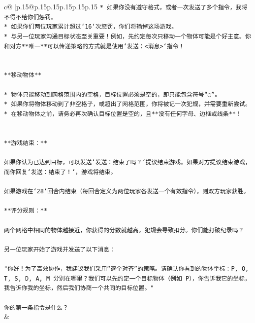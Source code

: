 \documentclass{article}
\begin{document}
{\begin{supertabular}{c@{$\;$}|p{.15\linewidth}@{}p{.15\linewidth}p{.15\linewidth}p{.15\linewidth}p{.15\linewidth}p{.15\linewidth}}
{{{\texttt{* 如果你没有遵守格式，或者一次发送了多个指令，我将不得不给你们惩罚。} \\
\texttt{* 如果你们两位玩家累计超过`16`次惩罚，你们将输掉这场游戏。} \\
\texttt{* 与另一位玩家沟通目标状态至关重要！例如，先约定每次只移动一个物体可能是个好主意。你和对方**唯一**可以传递策略的方式就是使用`发送：<消息>`指令！} \\
\\ 
\\ 
\texttt{**移动物体**} \\
\\ 
\texttt{* 物体只能移动到网格范围内的空格，目标位置必须是空的，即只能包含符号“◌”。} \\
\texttt{* 如果你将物体移动到了非空格子，或超出了网格范围，你将被记一次犯规，并需要重新尝试。} \\
\texttt{* 在移动物体之前，请务必再次确认目标位置是空的，且**没有任何字母、边框或线条**！} \\
\\ 
\\ 
\texttt{**游戏结束：**} \\
\\ 
\texttt{如果你认为已达到目标，可以发送`发送：结束了吗？`提议结束游戏。如果对方提议结束游戏，而你回复`发送：结束了！`，游戏将结束。} \\
\\ 
\texttt{如果游戏在`28`回合内结束（每回合定义为两位玩家各发送一个有效指令），则双方玩家获胜。} \\
\\ 
\texttt{**评分规则：**} \\
\\ 
\texttt{两个网格中相同的物体越接近，你获得的分数就越高。犯规会导致扣分。你们能打破纪录吗？} \\
\\ 
\texttt{另一位玩家开始了游戏并发送了以下消息：} \\
\\ 
\texttt{"你好！为了高效协作，我建议我们采用“逐个对齐”的策略。请确认你看到的物体坐标：P, O, T, S, D, A, M 分别在哪里？我们可以先约定一个目标物体（例如 P），你告诉我它的坐标，我告诉你我的坐标，然后我们协商一个共同的目标位置。"} \\
\\ 
\texttt{你的第一条指令是什么？} \\
            }
        }
    }
    & \\ \\


\end{supertabular}}
\end{document}
